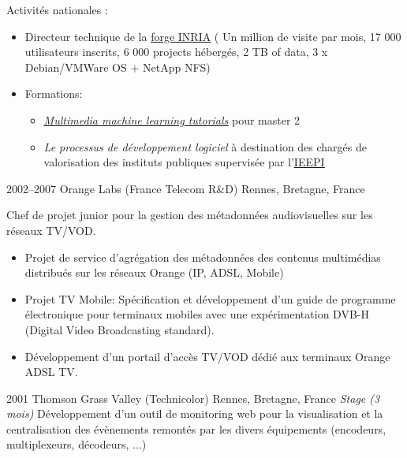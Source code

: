 \documentclass[]{friggeri-cv} %
\begin{document}
\begin{entrylist}
{Activités nationales : 
\begin{itemize}
\item Directeur technique de la \href{http://gforge.inria.fr}{\underline{forge INRIA}} 
(
Un million de visite par mois, 17 000 utilisateurs inscrits, 6 000 projects hébergés, 2 TB of data, 3 x Debian/VMWare OS + NetApp NFS)

\item Formations:
\begin{itemize}
\item \href{https://github.com/scampion/multimedia-machine-learning-tutorials}{\underline{\emph{Multimedia machine learning tutorials}}} pour master 2
\item \emph{Le processus de développement logiciel} à destination des chargés de valorisation des instituts publiques supervisée par l'\href{http://www.ieepi.org}{\underline{IEEPI}}
\end{itemize}
\end{itemize}
 
 }
\entry
{2002--2007}
 {Orange Labs {\normalfont  (France Telecom R\&D)}}
 {Rennes, Bretagne, France}
 {
 Chef de projet junior pour la gestion des métadonnées audiovisuelles sur les réseaux TV/VOD. 
 \begin{itemize}
\item Projet de service d'agrégation des métadonnées des contenus multimédias distribués sur les réseaux Orange (IP, ADSL, Mobile)
\item Projet TV Mobile: Spécification et développement d'un guide de programme électronique pour terminaux mobiles \cite{4114771} avec une expérimentation  DVB-H (Digital Video Broadcasting standard).
\item Développement  d'un portail d'accès TV/VOD  dédié aux terminaux Orange ADSL TV.
\end{itemize}
}


\entry
{2001}
{Thomson Grass Valley  {\normalfont  (Technicolor)}}
{Rennes, Bretagne, France}
{\emph{Stage (3 mois)} Développement d'un outil de monitoring web pour la visualisation et la centralisation des évènements remontés par les divers équipements (encodeurs, multiplexeurs, décodeurs, ...)}

\end{entrylist}

\newpage
\end{document}
